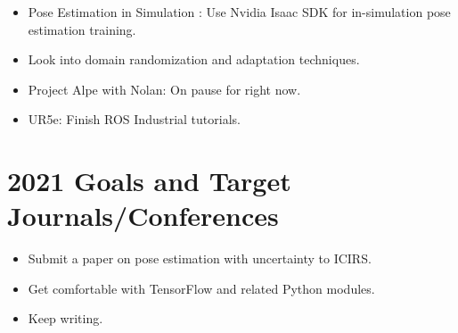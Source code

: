 \documentclass[11pt]{article}
\begin{document}
\begin{itemize}
      \item Pose Estimation in Simulation \cite{NVIDIAIs75:online}: Use Nvidia
      Isaac SDK for in-simulation pose estimation training.
      \item Look into domain randomization and adaptation techniques.
      \item Project Alpe with Nolan: On pause for right now.
      \item UR5e: Finish ROS Industrial tutorials.
\end{itemize}

\section{2021 Goals and Target Journals/Conferences}
\begin{itemize}
      \item Submit a paper on pose estimation with uncertainty to ICIRS.
      \item Get comfortable with TensorFlow and related Python modules.
      \item Keep writing.
\end{itemize}


\newpage


\end{document}
